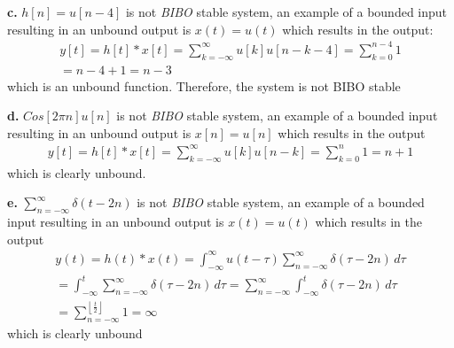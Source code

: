 \documentclass[12pt]{article}
\begin{document}
\textbf{c.} $h[n] = u[n - 4]$ is not \emph{BIBO} stable system, an example of a bounded input 
resulting in an unbound output is $x(t) = u(t)$ which results in the output:
\begin{align*}
y[t] = h[t] * x[t] = 
\sum_{k = -\infty}^{\infty} u[k] u[n - k - 4] = \sum_{k = 0}^{n - 4} 1 \\
= n - 4 + 1 = \boxed{n - 3}
\end{align*}
which is an unbound function. Therefore, the system is not BIBO stable

\textbf{d.} $Cos[2\pi n] u[n]$ is not \emph{BIBO} stable system, an example of a bounded input 
resulting in an unbound output is $x[n]= u[n]$ which results in the output
\begin{align*}
y[t] = h[t] * x[t] = 
\sum_{k = -\infty}^{\infty} u[k] u[n - k] 
= \sum_{k = 0}^{n} 1 
= \boxed{n +1 }
\end{align*}
which is clearly unbound.

\textbf{e.} $\sum_{n = -\infty}^{\infty}\delta(t - 2n)$ is not \emph{BIBO} stable system, an example of a bounded input 
resulting in an unbound output is $x(t)= u(t)$ which results in the output
\begin{align*}
	y(t) = h(t) * x(t) = 
	\int_{-\infty}^{\infty} u(t - \tau)\sum_{n = -\infty}^{\infty} \delta(\tau - 2n) \, d\tau \\
	= \int_{-\infty}^{t} \sum_{n = -\infty}^{\infty} \delta(\tau - 2n) \, d\tau = 
	\sum_{n = -\infty}^{\infty}  \int_{-\infty}^{t} \delta(\tau - 2n) \, d\tau \\
	= \sum_{n = -\infty}^{\left \lfloor{\frac{t}{2}}\right \rfloor } 1 
	= \boxed{\infty}
\end{align*}
which is clearly unbound
\end{document}
